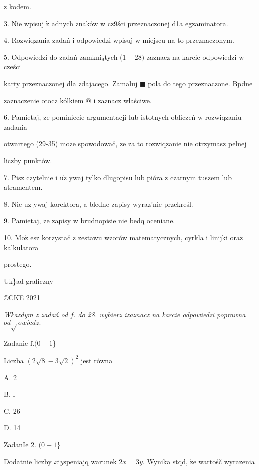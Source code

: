 \documentclass[a4paper,12pt]{article}
\begin{document}
z kodem.

3. Nie wpisuj $\dot{\mathrm{z}}$ adnych znaków w cz9ści przeznaczonej d1a egzaminatora.

4. Rozwiqzania zadań i odpowiedzi wpisuj w miejscu na to przeznaczonym.

5. Odpowiedzi do zadań $\mathrm{z}\mathrm{a}\mathrm{m}\mathrm{k}\mathrm{n}\mathrm{i}_{9}$tych ($1-28)$ zaznacz na karcie odpowiedzi w cześci

karty przeznaczonej dla zdajacego. Zamaluj $\blacksquare$ pola do tego przeznaczone. $\mathrm{B}$pdne

zaznaczenie otocz kólkiem @ i zaznacz wlaściwe.

6. Pamietaj, $\dot{\mathrm{z}}\mathrm{e}$ pominiecie argumentacji lub istotnych obliczeń w rozwiqzaniu zadania

otwartego (29-35) $\mathrm{m}\mathrm{o}\dot{\mathrm{z}}\mathrm{e}$ spowodowač, $\dot{\mathrm{z}}\mathrm{e}$ za to rozwiqzanie nie otrzymasz pelnej

liczby punktów.

7. Pisz czytelnie i $\mathrm{u}\dot{\mathrm{z}}$ ywaj tylko dlugopisu lub pióra z czarnym tuszem lub atramentem.

8. Nie $\mathrm{u}\dot{\mathrm{z}}$ ywaj korektora, a bledne zapisy wyraz'nie przekreśl.

9. Pamietaj, $\dot{\mathrm{z}}\mathrm{e}$ zapisy w brudnopisie nie bedq oceniane.

10. $\mathrm{M}\mathrm{o}\dot{\mathrm{z}}$ esz korzystač z zestawu wzorów matematycznych, cyrkla i linijki oraz kalkulatora

prostego.

Uk\}ad graficzny

\copyright CKE 2021




{\it Wkazdym z zadań od} $f.$ {\it do 28. wybierz izaznacz na karcie odpowiedzi poprawna} $od\sqrt{}owi\mathrm{e}d\acute{z}.$

Zadanie $\mathrm{f}. (0-1$\}

Liczba $(2\sqrt{8}-3\sqrt{2})^{2}$ jest równa

A. 2

B. l

C. 26

D. 14

ZadanIe 2. $(0-1$\}

Dodatnie liczby $x \mathrm{i} y \mathrm{s}\mathrm{p}\mathrm{e}$niajq warunek $2x=3y$. Wynika stqd, $\dot{\mathrm{z}}\mathrm{e}$ wartośč wyrazenia
\end{document}

